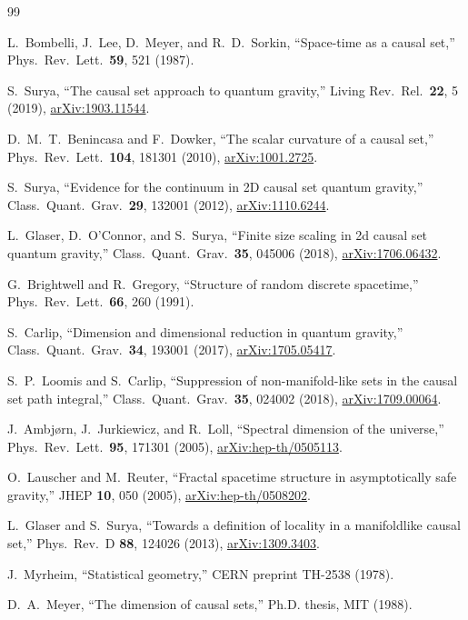 \documentclass[aps,prd,twocolumn,superscriptaddress,nofootinbib]{revtex4-2}
\begin{document}
\begin{thebibliography}{99}

L.~Bombelli, J.~Lee, D.~Meyer, and R.~D.~Sorkin,
``Space-time as a causal set,''
Phys.\ Rev.\ Lett.\ \textbf{59}, 521 (1987).

S.~Surya,
``The causal set approach to quantum gravity,''
Living Rev.\ Rel.\ \textbf{22}, 5 (2019),
\href{https://arxiv.org/abs/1903.11544}{arXiv:1903.11544}.

D.~M.~T.~Benincasa and F.~Dowker,
``The scalar curvature of a causal set,''
Phys.\ Rev.\ Lett.\ \textbf{104}, 181301 (2010),
\href{https://arxiv.org/abs/1001.2725}{arXiv:1001.2725}.

S.~Surya,
``Evidence for the continuum in 2D causal set quantum gravity,''
Class.\ Quant.\ Grav.\ \textbf{29}, 132001 (2012),
\href{https://arxiv.org/abs/1110.6244}{arXiv:1110.6244}.

L.~Glaser, D.~O'Connor, and S.~Surya,
``Finite size scaling in 2d causal set quantum gravity,''
Class.\ Quant.\ Grav.\ \textbf{35}, 045006 (2018),
\href{https://arxiv.org/abs/1706.06432}{arXiv:1706.06432}.

G.~Brightwell and R.~Gregory,
``Structure of random discrete spacetime,''
Phys.\ Rev.\ Lett.\ \textbf{66}, 260 (1991).

S.~Carlip,
``Dimension and dimensional reduction in quantum gravity,''
Class.\ Quant.\ Grav.\ \textbf{34}, 193001 (2017),
\href{https://arxiv.org/abs/1705.05417}{arXiv:1705.05417}.

S.~P.~Loomis and S.~Carlip,
``Suppression of non-manifold-like sets in the causal set path integral,''
Class.\ Quant.\ Grav.\ \textbf{35}, 024002 (2018),
\href{https://arxiv.org/abs/1709.00064}{arXiv:1709.00064}.

J.~Ambj\o{}rn, J.~Jurkiewicz, and R.~Loll,
``Spectral dimension of the universe,''
Phys.\ Rev.\ Lett.\ \textbf{95}, 171301 (2005),
\href{https://arxiv.org/abs/hep-th/0505113}{arXiv:hep-th/0505113}.

O.~Lauscher and M.~Reuter,
``Fractal spacetime structure in asymptotically safe gravity,''
JHEP \textbf{10}, 050 (2005),
\href{https://arxiv.org/abs/hep-th/0508202}{arXiv:hep-th/0508202}.

L.~Glaser and S.~Surya,
``Towards a definition of locality in a manifoldlike causal set,''
Phys.\ Rev.\ D \textbf{88}, 124026 (2013),
\href{https://arxiv.org/abs/1309.3403}{arXiv:1309.3403}.

J.~Myrheim,
``Statistical geometry,''
CERN preprint TH-2538 (1978).

D.~A.~Meyer,
``The dimension of causal sets,''
Ph.D. thesis, MIT (1988).

\end{thebibliography}
\end{document}
